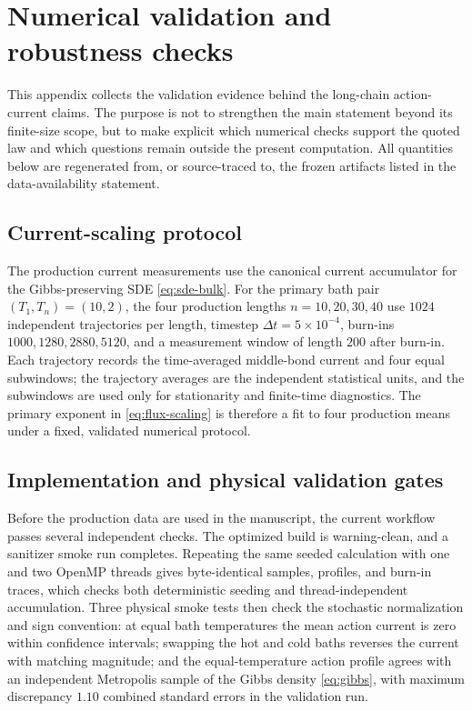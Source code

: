 \documentclass[11pt,a4paper]{article}
\theoremstyle{definition}
\numberwithin{equation}{section}   %
\begin{document}
\appendix

\section{Numerical validation and robustness checks}
\label{app:numerical-validation}

This appendix collects the validation evidence behind the long-chain
action-current claims. The purpose is not to strengthen the main statement
beyond its finite-size scope, but to make explicit which numerical checks
support the quoted law and which questions remain outside the present
computation. All quantities below are regenerated from, or source-traced to,
the frozen artifacts listed in the data-availability statement.

\subsection{Current-scaling protocol}
\label{app:current-protocol}

The production current measurements use the canonical current accumulator for
the Gibbs-preserving SDE \eqref{eq:sde-bulk}. For the primary bath pair
$(T_1,T_n)=(10,2)$, the four production lengths $n=10,20,30,40$ use
$1024$ independent trajectories per length, timestep
$\Delta t=5\times10^{-4}$, burn-ins $1000,1280,2880,5120$, and a measurement
window of length $200$ after burn-in. Each trajectory records the time-averaged
middle-bond current and four equal subwindows; the trajectory averages are the
independent statistical units, and the subwindows are used only for
stationarity and finite-time diagnostics. The primary exponent in
\eqref{eq:flux-scaling} is therefore a fit to four production means under a
fixed, validated numerical protocol.

\subsection{Implementation and physical validation gates}
\label{app:validation-gates}

Before the production data are used in the manuscript, the current workflow
passes several independent checks. The optimized build is warning-clean, and a
sanitizer smoke run completes. Repeating the same seeded calculation with one
and two OpenMP threads gives byte-identical samples, profiles, and burn-in
traces, which checks both deterministic seeding and thread-independent
accumulation. Three physical smoke tests then check the stochastic
normalization and sign convention: at equal bath temperatures the mean action
current is zero within confidence intervals; swapping the hot and cold baths
reverses the current with matching magnitude; and the equal-temperature action
profile agrees with an independent Metropolis sample of the Gibbs density
\eqref{eq:gibbs}, with maximum discrepancy $1.10$ combined standard errors in
the validation run.
\end{document}
